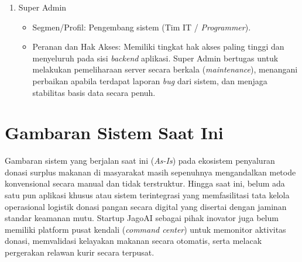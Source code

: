\begin{enumerate}
\begin{itemize}
        \item Peranan dan Hak Akses: Memiliki hak akses dashboard admin untuk memverifikasi keabsahan pendaftaran akun baru secara manual, membekukan atau memblokir akun yang terbukti melakukan penyalahgunaan, menindaklanjuti laporan negatif, serta memantau Dasbor Statistik makro yang menampilkan peta panas (\textit{heatmap}) sebaran wilayah donasi dan kalkulasi SROI keseluruhan.
    \end{itemize}
    \item Super Admin
    \begin{itemize}
        \item Segmen/Profil: Pengembang sistem (Tim IT / \textit{Programmer}).
        \item Peranan dan Hak Akses: Memiliki tingkat hak akses paling tinggi dan menyeluruh pada sisi \textit{backend} aplikasi. Super Admin bertugas untuk melakukan pemeliharaan server secara berkala (\textit{maintenance}), menangani perbaikan apabila terdapat laporan \textit{bug} dari sistem, dan menjaga stabilitas basis data secara penuh.
    \end{itemize}
\end{enumerate}

\newpage

\section{Gambaran Sistem Saat Ini}
Gambaran sistem yang berjalan saat ini (\textit{As-Is}) pada ekosistem penyaluran donasi surplus makanan di masyarakat masih sepenuhnya mengandalkan metode konvensional secara manual dan tidak terstruktur. Hingga saat ini, belum ada satu pun aplikasi khusus atau sistem terintegrasi yang memfasilitasi tata kelola operasional logistik donasi pangan secara digital yang disertai dengan jaminan standar keamanan mutu. Startup JagoAI sebagai pihak inovator juga belum memiliki platform pusat kendali (\textit{command center}) untuk memonitor aktivitas donasi, memvalidasi kelayakan makanan secara otomatis, serta melacak pergerakan relawan kurir secara terpusat.
